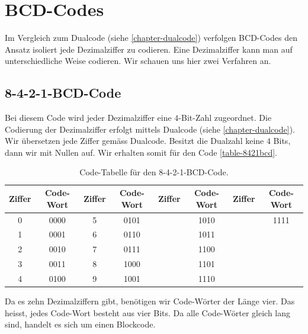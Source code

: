 \toggletrue{image}
\toggletrue{imagehover}

\chapter{BCD-Codes}
\label{chapter-bcd-codes}

Im Vergleich zum Dualcode (siehe \autoref{chapter-dualcode}) verfolgen \ac{BCD}-Codes den Ansatz isoliert jede Dezimalziffer zu codieren. Eine Dezimalziffer kann man auf unterschiedliche Weise codieren. Wir schauen uns hier zwei Verfahren an.

\section{8-4-2-1-BCD-Code}

Bei diesem Code wird jeder Dezimalziffer eine $4$-Bit-Zahl zugeordnet. Die Codierung der Dezimalziffer erfolgt mittels Dualcode (siehe \autoref{chapter-dualcode}). Wir übersetzen jede Ziffer gemäss Dualcode. Besitzt die Dualzahl keine $4$ Bits, dann  wir mit Nullen auf. Wir erhalten somit für den Code \autoref{table-8421bcd}.

\begin{table}[htb]
\centering
\begin{tabular}{|c|c|c|c|c|c|c|c|}
\hline
Ziffer & Code-Wort & Ziffer & Code-Wort & Ziffer & Code-Wort & Ziffer & Code-Wort \\ \hline
0       &   0000        & 5       &   0101        &         &  1010   &         &  1111      \\ \hline
1       &   0001        & 6       &   0110        &         &  1011   & &     \\ \hline
2       &   0010        & 7       &   0111        &         &  1100    & &     \\ \hline
3       &   0011        & 8       &   1000        &         &  1101    & &    \\ \hline
4       &   0100        & 9       &   1001        &         &  1110    & &     \\ \hline
\end{tabular}
\caption{Code-Tabelle für den 8-4-2-1-\ac{BCD}-Code.}
\label{table-8421bcd}
\end{table}

Da es zehn Dezimalziffern gibt, benötigen wir Code-Wörter der Länge vier. Das heisst, jedes Code-Wort besteht aus vier Bits. Da alle Code-Wörter gleich lang sind, handelt es sich um einen Blockcode.

